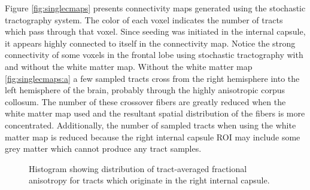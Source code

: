 Figure \ref{fig:singlecmaps} presents connectivity maps generated using the stochastic tractography system.  The color of each voxel indicates the number of tracts which pass through that voxel.  Since seeding was initiated in the internal capsule, it appears highly connected to itself in the connectivity map.  Notice the strong connectivity of some voxels in the frontal lobe using stochastic tractography with and without the white matter map.  Without the white matter map \ref{fig:singlecmaps:a} a few sampled tracts cross from the right hemisphere into the left hemisphere of the brain, probably through the highly anisotropic corpus collosum.  The number of these crossover fibers are greatly reduced when the white matter map used and the resultant spatial distribution of the fibers is more concentrated.  Additionally, the number of sampled tracts when using the white matter map is reduced because the right internal capsule ROI may include some grey matter which cannot produce any tract samples.

\begin{figure}
  \label{fig:singleFAhistograms}
	\caption{Histogram showing distribution of tract-averaged fractional anisotropy for tracts which originate in the right internal capsule.}
\end{figure}

